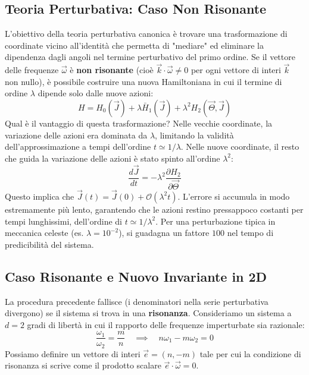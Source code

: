 \documentclass[12pt,a4paper]{article}
\begin{document}
\subsection{Teoria Perturbativa: Caso Non Risonante}
L'obiettivo della teoria perturbativa canonica è trovare una trasformazione di coordinate vicino all'identità che permetta di "mediare" ed eliminare la dipendenza dagli angoli nel termine perturbativo del primo ordine. Se il vettore delle frequenze $\vec{\omega}$ è \textbf{non risonante} (cioè $\vec{k} \cdot \vec{\omega} \neq 0$ per ogni vettore di interi $\vec{k}$ non nullo), è possibile costruire una nuova Hamiltoniana in cui il termine di ordine $\lambda$ dipende solo dalle nuove azioni:
\begin{equation}
H = H_0(\vec{J}) + \lambda \bar{H}_1(\vec{J}) + \lambda^2 H_2(\vec{\Theta}, \vec{J})
\end{equation}
Qual è il vantaggio di questa trasformazione? 
Nelle vecchie coordinate, la variazione delle azioni era dominata da $\lambda$, limitando la validità dell'approssimazione a tempi dell'ordine $t \simeq 1/\lambda$. Nelle nuove coordinate, il resto che guida la variazione delle azioni è stato spinto all'ordine $\lambda^2$:
\begin{equation}
\frac{d\vec{J}}{dt} = -\lambda^2 \frac{\partial H_2}{\partial \vec{\Theta}}
\end{equation}
Questo implica che $\vec{J}(t) = \vec{J}(0) + \mathcal{O}(\lambda^2 t)$. L'errore si accumula in modo estremamente più lento, garantendo che le azioni restino pressappoco costanti per tempi lunghissimi, dell'ordine di $t \simeq 1/\lambda^2$. Per una perturbazione tipica in meccanica celeste (es. $\lambda = 10^{-2}$), si guadagna un fattore $100$ nel tempo di predicibilità del sistema.

\subsection{Caso Risonante e Nuovo Invariante in 2D}
La procedura precedente fallisce (i denominatori nella serie perturbativa divergono) se il sistema si trova in una \textbf{risonanza}.
Consideriamo un sistema a $d=2$ gradi di libertà in cui il rapporto delle frequenze imperturbate sia razionale:
\begin{equation}
\frac{\omega_1}{\omega_2} = \frac{m}{n} \quad \implies \quad n\omega_1 - m\omega_2 = 0
\end{equation}
Possiamo definire un vettore di interi $\vec{e} = (n, -m)$ tale per cui la condizione di risonanza si scrive come il prodotto scalare $\vec{e} \cdot \vec{\omega} = 0$.
\end{document}
